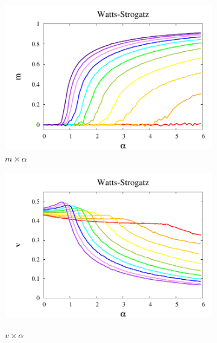 \begin{figure}
    \centering
    \begin{subfigure}[]{0.65\textwidth}
        \includegraphics[width = \textwidth]{Figures/DeltaXBeta_Mag}
        \caption{$m\times\alpha$}
        \label{fig:fm}
    \end{subfigure}
    \begin{subfigure}[]{0.65\textwidth}
        \includegraphics[width = \textwidth]{Figures/DeltaXBeta_Var}
        \label{fig:fv}
        \caption{$v\times\alpha$}
    \end{subfigure}
    \begin{subfigure}[]{0.65\textwidth}

\end{subfigure}
\end{figure}
